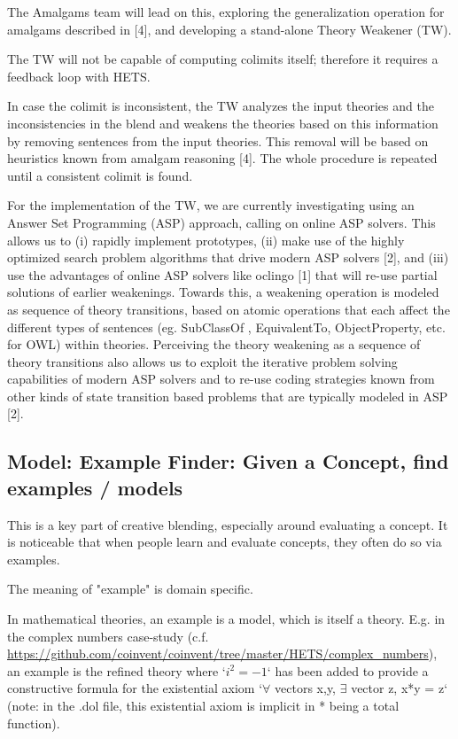 \documentclass[a4paper,twoside,11pt]{article}
\begin{document}
The Amalgams team will lead on this, exploring the generalization operation for amalgams described in [4], and developing a stand-alone Theory Weakener (TW).

The TW will not be capable of computing colimits itself; therefore it requires a feedback loop with HETS.

In case the colimit is inconsistent, the TW analyzes the input theories and the inconsistencies
in the blend and weakens the theories based on this information by removing sentences from the
input theories. This removal will be based on heuristics known from amalgam reasoning [4]. The whole procedure is repeated until a consistent colimit is found.

For the implementation of the TW, we are currently investigating using an 
Answer Set Programming (ASP) approach, calling on online ASP solvers. This allows us to (i) rapidly implement prototypes, 
(ii) make use of the highly optimized search problem algorithms that drive modern ASP solvers [2], and (iii) use the advantages of online ASP solvers like oclingo [1] that will re-use partial solutions of earlier weakenings. Towards this, a weakening operation is modeled as sequence of theory transitions, based on atomic operations that each affect the different types of sentences (eg. SubClassOf , EquivalentTo, ObjectProperty, etc. for OWL) within theories. Perceiving the theory weakening as a sequence of theory transitions also allows us to exploit the iterative problem solving capabilities of modern ASP solvers and to re-use coding strategies known from other kinds
of state transition based problems that are typically modeled in ASP [2].

\subsection{Model: Example Finder: Given a Concept, find examples / models}

This is a key part of creative blending, especially around evaluating a concept. 
It is noticeable that when people learn and evaluate concepts, they often do so via examples.

The meaning of "example" is domain specific.

In mathematical theories, an example is a model, which is itself a theory. 
E.g. in the complex numbers case-study (c.f. \url{https://github.com/coinvent/coinvent/tree/master/HETS/complex_numbers}), 
an example is the refined theory where `$i^2 = -1$` has been added to provide a constructive formula for the existential
axiom `$\forall$ vectors x,y, $\exists$ vector z, x*y = z` (note: in the .dol file, this existential axiom is 
implicit in * being a total function).
 
\end{document}
